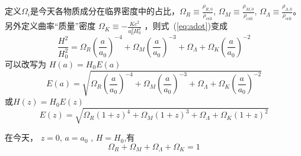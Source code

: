 \documentclass[12pt]{ctexart}
\newcommand{\refeq}[1]{式~(\ref{#1})}
\begin{document}
定义$\Omega_i$是今天各物质成分在临界密度中的占比，$\Omega_R\equiv\frac{\rho_{R,0}}{\rho_\text{crit}}$, $\Omega_M\equiv\frac{\rho_{M,0}}{\rho_\text{crit}}$, $\Omega_\Lambda\equiv\frac{\rho_{\Lambda,0}}{\rho_\text{crit}}$。
另外定义曲率“质量”密度 $\Omega_K \equiv -\frac{K c^2}{a_0^2 H_0^2}$ ，则\refeq{eq:adot}变成
\begin{equation}
    \frac{H^2}{H_0^2} = \Omega_R \left(\frac{a}{a_0}\right)^{-4} + \Omega_M \left(\frac{a}{a_0}\right)^{-3} + \Omega_\Lambda + \Omega_K \left(\frac{a}{a_0}\right)^{-2}
\end{equation}
可以改写为 $H(a)=H_0 E(a)$
\begin{equation}
    E(a) = \sqrt{ \Omega_R \left(\frac{a}{a_0}\right)^{-4} + \Omega_M \left(\frac{a}{a_0}\right)^{-3} + \Omega_\Lambda + \Omega_K \left(\frac{a}{a_0}\right)^{-2} }
\end{equation}
或$H(z)=H_0 E(z)$
\begin{equation}
    E(z) = \sqrt{ \Omega_R \left(1+z\right)^{4} + \Omega_M \left(1+z\right)^{3} + \Omega_\Lambda + \Omega_K \left(1+z\right)^{2} }
\end{equation}

在今天， $z=0$, $a=a_0$ , $H=H_0$,有
\begin{equation}
    \Omega_R + \Omega_M + \Omega_\Lambda + \Omega_K = 1 \label{eq:allOmega}
\end{equation}
\end{document}
